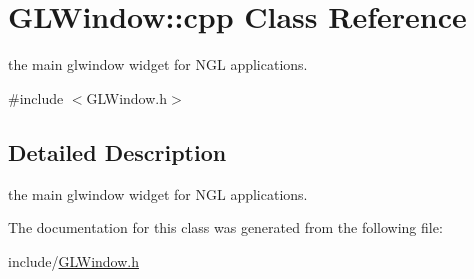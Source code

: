 \hypertarget{classGLWindow_1_1cpp}{
\section{GLWindow::cpp Class Reference}
\label{classGLWindow_1_1cpp}
}


the main glwindow widget for NGL applications.  


{\ttfamily \#include $<$GLWindow.h$>$}

\subsection{Detailed Description}
the main glwindow widget for NGL applications. 

The documentation for this class was generated from the following file:\begin{DoxyCompactItemize}
\item 
include/\hyperlink{GLWindow_8h}{GLWindow.h}\end{DoxyCompactItemize}
